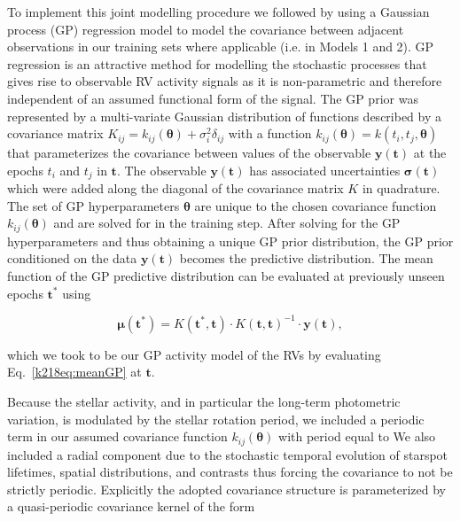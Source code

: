 To implement this joint modelling procedure
we followed \cite{cloutier17} by using a Gaussian process (GP) regression model to model the covariance between
adjacent observations in our training sets where applicable (i.e. in Models 1 and 2).
GP regression is an attractive method for modelling the
stochastic processes that gives rise to observable RV activity signals as it is non-parametric and therefore
independent of an assumed functional form of the signal. The GP prior was represented by a multi-variate
Gaussian distribution of functions described by a covariance matrix
$K_{ij}=k_{ij}(\boldsymbol{\theta}) + \sigma^2_i\delta_{ij}$
with a function $k_{ij}(\boldsymbol{\theta})=k(t_i,t_j,\boldsymbol{\theta})$ that parameterizes the
covariance between values of the observable $\mathbf{y}(\mathbf{t})$ at the epochs $t_i$ and $t_j$ in
$\mathbf{t}$. The observable $\mathbf{y}(\mathbf{t})$ has associated uncertainties
$\boldsymbol{\sigma}(\mathbf{t})$
which were added along the diagonal of the covariance matrix $K$ in quadrature. 
The set of GP hyperparameters $\boldsymbol{\theta}$ are unique to the chosen covariance function
$k_{ij}(\boldsymbol{\theta})$ and are solved for in the training step. After solving for the
GP hyperparameters and thus obtaining a unique GP prior distribution, the GP prior conditioned on the data
$\mathbf{y}(\mathbf{t})$ becomes the predictive distribution. The mean function of the GP predictive distribution
can be evaluated at previously unseen epochs $\mathbf{t^*}$ using 

\begin{equation}
  \boldsymbol{\mu}(\mathbf{t^*}) = K(\mathbf{t^*},\mathbf{t}) \cdot K(\mathbf{t},\mathbf{t})^{-1} \cdot
  \mathbf{y}(\mathbf{t}), \label{k218eq:meanGP}
\end{equation}

\noindent which we took to be our GP activity model of the RVs 
by evaluating Eq.~\ref{k218eq:meanGP} at $\mathbf{t}$.

Because the stellar activity, and in particular the long-term photometric variation,
is modulated by the stellar rotation period, we included a
periodic term in our assumed covariance function $k_{ij}(\boldsymbol{\theta})$
with period equal to  We also included a radial component 
due to the stochastic temporal evolution of starspot lifetimes, spatial distributions,
and contrasts thus forcing the covariance to not be strictly periodic.
Explicitly the adopted covariance structure is
parameterized by a quasi-periodic covariance kernel of the form

